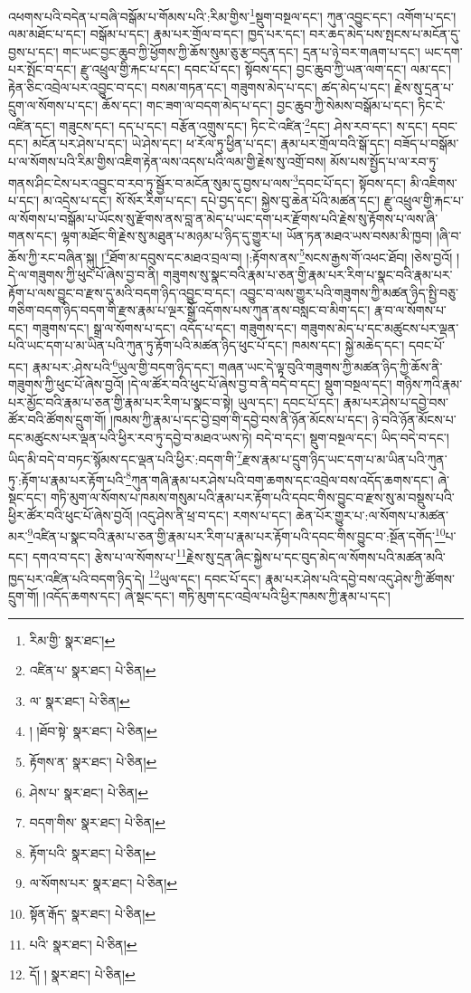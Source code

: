 འཕགས་པའི་བདེན་པ་བཞི་བསྒོམ་པ་གོམས་པའི་:རིམ་གྱིས་\footnote{རིམ་གྱི་  སྣར་ཐང་། }སྡུག་བསྔལ་དང་། ཀུན་འབྱུང་དང་། འགོག་པ་དང་། ལམ་མཐོང་པ་དང་། བསྒོམ་པ་དང་། རྣམ་པར་གྲོལ་བ་དང་། ཁྱད་པར་དང་། བར་ཆད་མེད་པས་སྤངས་པ་མངོན་དུ་བྱས་པ་དང་། གང་ཡང་བྱང་ཆུབ་ཀྱི་ཕྱོགས་ཀྱི་ཆོས་སུམ་ཅུ་རྩ་བདུན་དང་། དྲན་པ་ཉེ་བར་གཞག་པ་དང་། ཡང་དག་པར་སྤོང་བ་དང་། རྫུ་འཕྲུལ་གྱི་རྐང་པ་དང་། དབང་པོ་དང་། སྟོབས་དང་། བྱང་ཆུབ་ཀྱི་ཡན་ལག་དང་། ལམ་དང་། རྟེན་ཅིང་འབྲེལ་པར་འབྱུང་བ་དང་། བསམ་གཏན་དང་། གཟུགས་མེད་པ་དང་། ཚད་མེད་པ་དང་། རྗེས་སུ་དྲན་པ་དྲུག་ལ་སོགས་པ་དང་། ཆོས་དང་། གང་ཟག་ལ་བདག་མེད་པ་དང་། བྱང་ཆུབ་ཀྱི་སེམས་བསྒོམ་པ་དང་། ཏིང་ངེ་འཛིན་དང་། གཟུངས་དང་། དད་པ་དང་། བརྩོན་འགྲུས་དང་། ཏིང་ངེ་འཛིན་\footnote{འཛིན་པ་  སྣར་ཐང་།  པེ་ཅིན། }དང་། ཤེས་རབ་དང་། ས་དང་། དབང་དང་། མངོན་པར་ཤེས་པ་དང་། ཡེ་ཤེས་དང་། ཕ་རོལ་ཏུ་ཕྱིན་པ་དང་། རྣམ་པར་གྲོལ་བའི་སྒོ་དང་། བཟོད་པ་བསྒོམ་པ་ལ་སོགས་པའི་རིམ་གྱིས་འཇིག་རྟེན་ལས་འདས་པའི་ལམ་གྱི་རྗེས་སུ་འགྲོ་བས། མོས་པས་སྤྱོད་པ་ལ་རབ་ཏུ་གནས་ཤིང་ངེས་པར་འབྱུང་བ་རབ་ཏུ་སྦྱོར་བ་མངོན་སུམ་དུ་བྱས་པ་ལས་\footnote{ལ་  སྣར་ཐང་།  པེ་ཅིན། }དབང་པོ་དང་། སྟོབས་དང་། མི་འཇིགས་པ་དང་། མ་འདྲེས་པ་དང་། སོ་སོར་རིག་པ་དང་། དཔེ་བྱད་དང་། སྐྱེས་བུ་ཆེན་པོའི་མཚན་དང་། རྫུ་འཕྲུལ་གྱི་རྐང་པ་ལ་སོགས་པ་བསྒོམ་པ་ཡོངས་སུ་རྫོགས་ནས་བླ་ན་མེད་པ་ཡང་དག་པར་རྫོགས་པའི་རྗེས་སུ་རྟོགས་པ་ལས་ཞི་གནས་དང་། ལྷག་མཐོང་གི་རྗེས་སུ་མཐུན་པ་མཉམ་པ་ཉིད་དུ་གྱུར་པ། ཡོན་ཏན་མཐའ་ཡས་བསམ་མི་ཁྱབ། །ཞི་བ་ཆོས་ཀྱི་རང་བཞིན་སྐུ། །\footnote{། །ཐོབ་སྟེ་  སྣར་ཐང་།  པེ་ཅིན། }ཐོག་མ་དབུས་དང་མཐའ་བྲལ་བ། །:རྟོགས་ནས་\footnote{རྟོགས་ན་  སྣར་ཐང་།  པེ་ཅིན། }སངས་རྒྱས་གོ་འཕང་ཐོབ། །ཅེས་བྱའོ། །དེ་ལ་གཟུགས་ཀྱི་ཕུང་པོ་ཞེས་བྱ་བ་ནི། གཟུགས་སུ་སྣང་བའི་རྣམ་པ་ཅན་གྱི་རྣམ་པར་རིག་པ་སྣང་བའི་རྣམ་པར་རྟོག་པ་ལས་བྱུང་བ་རྫས་དུ་མའི་བདག་ཉིད་འབྱུང་བ་དང་། འབྱུང་བ་ལས་གྱུར་པའི་གཟུགས་ཀྱི་མཚན་ཉིད་སྤྱི་བཅུ་གཅིག་བདག་ཉིད་བདག་གི་རྫས་རྣམ་པ་ལྔར་སྒྲོ་འདོགས་པས་ཀུན་ནས་བསླང་བ་མིག་དང་། རྣ་བ་ལ་སོགས་པ་དང་། གཟུགས་དང་། སྒྲ་ལ་སོགས་པ་དང་། འདོད་པ་དང་། གཟུགས་དང་། གཟུགས་མེད་པ་དང་མཚུངས་པར་ལྡན་པའི་ཡང་དག་པ་མ་ཡིན་པའི་ཀུན་ཏུ་རྟོག་པའི་མཚན་ཉིད་ཕུང་པོ་དང་། ཁམས་དང་། སྐྱེ་མཆེད་དང་། དབང་པོ་དང་། རྣམ་པར་:ཤེས་པའི་\footnote{ཤེས་པ་  སྣར་ཐང་།  པེ་ཅིན། }ཡུལ་གྱི་བདག་ཉིད་དང་། གཞན་ཡང་དེ་ལྟ་བུའི་གཟུགས་ཀྱི་མཚན་ཉིད་ཀྱི་ཆོས་ནི་གཟུགས་ཀྱི་ཕུང་པོ་ཞེས་བྱའོ། །དེ་ལ་ཚོར་བའི་ཕུང་པོ་ཞེས་བྱ་བ་ནི་བདེ་བ་དང་། སྡུག་བསྔལ་དང་། གཉིས་ཀའི་རྣམ་པར་མྱོང་བའི་རྣམ་པ་ཅན་གྱི་རྣམ་པར་རིག་པ་སྣང་བ་སྟེ། ཡུལ་དང་། དབང་པོ་དང་། རྣམ་པར་ཤེས་པ་དབྱེ་བས་ཚོར་བའི་ཚོགས་དྲུག་གོ། །ཁམས་ཀྱི་རྣམ་པ་དང་བྱེ་བྲག་གི་དབྱེ་བས་ནི་ཉོན་མོངས་པ་དང་། ཉེ་བའི་ཉོན་མོངས་པ་དང་མཚུངས་པར་ལྡན་པའི་ཕྱིར་རབ་ཏུ་དབྱེ་བ་མཐའ་ཡས་ཏེ། བདེ་བ་དང་། སྡུག་བསྔལ་དང་། ཡིད་བདེ་བ་དང་། ཡིད་མི་བདེ་བ་བཏང་སྙོམས་དང་ལྡན་པའི་ཕྱིར་:བདག་གི་\footnote{བདག་གིས་  སྣར་ཐང་།  པེ་ཅིན། }རྫས་རྣམ་པ་དྲུག་ཉིད་ཡང་དག་པ་མ་ཡིན་པའི་ཀུན་ཏུ་:རྟོག་པ་རྣམ་པར་རྟོག་པའི་\footnote{རྟོག་པའི་  སྣར་ཐང་།  པེ་ཅིན། }ཀུན་གཞི་རྣམ་པར་ཤེས་པའི་བག་ཆགས་དང་འབྲེལ་བས་འདོད་ཆགས་དང་། ཞེ་སྡང་དང་། གཏི་མུག་ལ་སོགས་པ་ཁམས་གསུམ་པའི་རྣམ་པར་རྟོག་པའི་དབང་གིས་བྱུང་བ་རྫས་སུ་མ་བསྡུས་པའི་ཕྱིར་ཚོར་བའི་ཕུང་པོ་ཞེས་བྱའོ། །འདུ་ཤེས་ནི་ཕྲ་བ་དང་། རགས་པ་དང་། ཆེན་པོར་གྱུར་པ་:ལ་སོགས་པ་མཚན་མར་\footnote{ལ་སོགས་པར་  སྣར་ཐང་།  པེ་ཅིན། }འཛིན་པ་སྣང་བའི་རྣམ་པ་ཅན་གྱི་རྣམ་པར་རིག་པ་རྣམ་པར་རྟོག་པའི་དབང་གིས་བྱུང་བ་:སྔོན་དགོད་\footnote{སྟོན་རྒོད་  སྣར་ཐང་།  པེ་ཅིན། }པ་དང་། དགའ་བ་དང་། རྩེས་པ་ལ་སོགས་པ་\footnote{པའི་  སྣར་ཐང་།  པེ་ཅིན། }རྗེས་སུ་དྲན་ཞིང་སྐྱེས་པ་དང་བུད་མེད་ལ་སོགས་པའི་མཚན་མའི་ཁྱད་པར་འཛིན་པའི་བདག་ཉིད་དེ། \footnote{དོ། །   སྣར་ཐང་།  པེ་ཅིན། }ཡུལ་དང་། དབང་པོ་དང་། རྣམ་པར་ཤེས་པའི་དབྱེ་བས་འདུ་ཤེས་ཀྱི་ཚོགས་དྲུག་གོ། །འདོད་ཆགས་དང་། ཞེ་སྡང་དང་། གཏི་མུག་དང་འབྲེལ་པའི་ཕྱིར་ཁམས་ཀྱི་རྣམ་པ་དང་། 